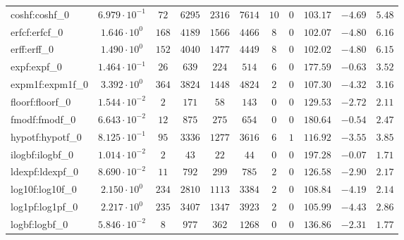 \begin{tabular}{|l|c|c|c|c|c|c|c|c|c|c|}
coshf:coshf\_0               & $ 6.979 \cdot 10^{-1} $ & $ 72     $ & $ 6295   $ & $ 2316  $ & $ 7614   $ & $ 10  $ & $ 0 $ & $ 103.17      $ & $ -4.69   $ & $ 5.48    $ \\
erfcf:erfcf\_0               & $ 1.646 \cdot 10^{0}  $ & $ 168    $ & $ 4189   $ & $ 1566  $ & $ 4466   $ & $ 8   $ & $ 0 $ & $ 102.07      $ & $ -4.80   $ & $ 6.16    $ \\
erff:erff\_0                 & $ 1.490 \cdot 10^{0}  $ & $ 152    $ & $ 4040   $ & $ 1477  $ & $ 4449   $ & $ 8   $ & $ 0 $ & $ 102.02      $ & $ -4.80   $ & $ 6.15    $ \\
expf:expf\_0                 & $ 1.464 \cdot 10^{-1} $ & $ 26     $ & $ 639    $ & $ 224   $ & $ 514    $ & $ 6   $ & $ 0 $ & $ 177.59      $ & $ -0.63   $ & $ 3.52    $ \\
expm1f:expm1f\_0             & $ 3.392 \cdot 10^{0}  $ & $ 364    $ & $ 3824   $ & $ 1448  $ & $ 4824   $ & $ 2   $ & $ 0 $ & $ 107.30      $ & $ -4.32   $ & $ 3.16    $ \\
floorf:floorf\_0             & $ 1.544 \cdot 10^{-2} $ & $ 2      $ & $ 171    $ & $ 58    $ & $ 143    $ & $ 0   $ & $ 0 $ & $ 129.53      $ & $ -2.72   $ & $ 2.11    $ \\
fmodf:fmodf\_0               & $ 6.643 \cdot 10^{-2} $ & $ 12     $ & $ 875    $ & $ 275   $ & $ 654    $ & $ 0   $ & $ 0 $ & $ 180.64      $ & $ -0.54   $ & $ 2.47    $ \\
hypotf:hypotf\_0             & $ 8.125 \cdot 10^{-1} $ & $ 95     $ & $ 3336   $ & $ 1277  $ & $ 3616   $ & $ 6   $ & $ 1 $ & $ 116.92      $ & $ -3.55   $ & $ 3.85    $ \\
ilogbf:ilogbf\_0             & $ 1.014 \cdot 10^{-2} $ & $ 2      $ & $ 43     $ & $ 22    $ & $ 44     $ & $ 0   $ & $ 0 $ & $ 197.28      $ & $ -0.07   $ & $ 1.71    $ \\
ldexpf:ldexpf\_0             & $ 8.690 \cdot 10^{-2} $ & $ 11     $ & $ 792    $ & $ 299   $ & $ 785    $ & $ 2   $ & $ 0 $ & $ 126.58      $ & $ -2.90   $ & $ 2.17    $ \\
log10f:log10f\_0             & $ 2.150 \cdot 10^{0}  $ & $ 234    $ & $ 2810   $ & $ 1113  $ & $ 3384   $ & $ 2   $ & $ 0 $ & $ 108.84      $ & $ -4.19   $ & $ 2.14    $ \\
log1pf:log1pf\_0             & $ 2.217 \cdot 10^{0}  $ & $ 235    $ & $ 3407   $ & $ 1347  $ & $ 3923   $ & $ 2   $ & $ 0 $ & $ 105.99      $ & $ -4.43   $ & $ 2.86    $ \\
logbf:logbf\_0               & $ 5.846 \cdot 10^{-2} $ & $ 8      $ & $ 977    $ & $ 362   $ & $ 1268   $ & $ 0   $ & $ 0 $ & $ 136.86      $ & $ -2.31   $ & $ 1.77    $ \\

\end{tabular}
